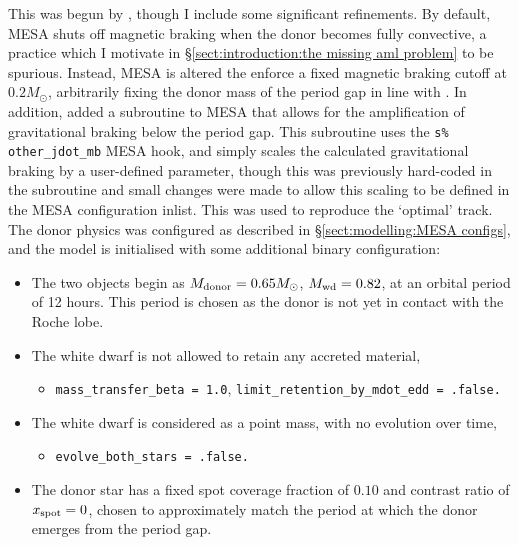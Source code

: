 This was begun by \citet{Pala2017a}, though I include some significant refinements.
By default, MESA shuts off magnetic braking when the donor becomes fully convective, a practice which I motivate in \S\ref{sect:introduction:the missing aml problem} to be spurious. Instead, MESA is altered the enforce a fixed magnetic braking cutoff at $0.2 M_\odot$, arbitrarily fixing the donor mass of the period gap in line with \citet{knigge11}.
In addition, \citet{Pala2017a} added a subroutine to MESA that allows for the amplification of gravitational braking below the period gap.
This subroutine uses the \lstinline{s% other_jdot_mb} MESA hook, and simply scales the calculated gravitational braking by a user-defined parameter, though this was previously hard-coded in the subroutine and small changes were made to allow this scaling to be defined in the MESA configuration inlist.
This was used to reproduce the `optimal' track. The donor physics was configured as described in \S\ref{sect:modelling:MESA configs}, and the model is initialised with some additional binary configuration:
\begin{itemize}
    \item The two objects begin as $M_{\rm donor} = 0.65 M_\odot$, $M_{\rm wd} = 0.82$, at an orbital period of 12 hours. This period is chosen as the donor is not yet in contact with the Roche lobe.
    \item The white dwarf is not allowed to retain any accreted material,
    \begin{itemize}
        \item \lstinline{mass_transfer_beta = 1.0}, \lstinline{limit_retention_by_mdot_edd = .false.}
    \end{itemize}
    \item The white dwarf is considered as a point mass, with no evolution over time,
    \begin{itemize}
        \item \lstinline{evolve_both_stars = .false.}
    \end{itemize}
    \item The donor star has a fixed spot coverage fraction of $0.10$ and contrast ratio of $x_{\rm spot} = 0$, chosen to approximately match the period at which the donor emerges from the period gap.
\end{itemize}


